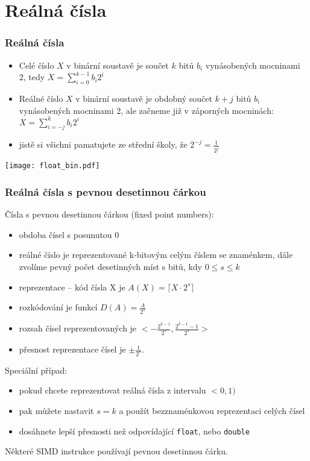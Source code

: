 \documentclass{beamer}
\begin{document}
\section{Reálná čísla}


\begin{frame}
\frametitle{Reálná čísla}

\begin{itemize}
\item Celé číslo $X$ v binární soustavě je součet $k$ bitů $b_i$ vynásobených mocninami 2, tedy $ X = \sum_{i=0}^{k-1} b_i 2^{i} $
\item Reálné číslo $X$ v binární soustavě je obdobný součet $k+j$ bitů $b_i$ vynásobených mocninami 2, ale začneme již v záporných mocninách: $X = \sum_{i=-j}^{k} b_i 2^{i}$
\item jistě si všichni pamatujete ze střední školy, že $2^{-j} = \frac{1}{2^j}$
\end{itemize}


\begin{center}
\texttt{[image: float\_bin.pdf]}
\end{center}

\end{frame}


\begin{frame}
\frametitle{Reálná čísla s pevnou desetinnou čárkou}

Čísla s pevnou desetinnou čárkou (fixed point numbers):

\begin{itemize}
\item obdoba čísel s posunutou 0
\item reálné číslo je reprezentované k-bitovým celým číslem se znaménkem, dále zvolíme pevný počet desetinných míst s bitů, kdy $0 \le s \le k$
\item reprezentace -- kód čísla X je $A(X) = \lceil X \cdot 2^s \rceil$
\item rozkódování je funkcí $D(A) = \frac{A}{2^s}$
\item rozsah čísel reprezentovaných je $<-\frac{2^{k-1}}{2^s}, \frac{2^{k-1}-1}{2^s}>$
\item přesnost reprezentace čísel je $\pm \frac{1}{2^s}$.
\end{itemize}

Speciální případ:
\begin{itemize}
\item pokud chcete reprezentovat reálná čísla z intervalu $<0,1)$
\item pak můžete nastavit $s=k$ a použít bezznaménkovou reprezentaci celých čísel
\item dosáhnete lepší přesnosti než odpovídající \texttt{float}, nebo \texttt{double}
\end{itemize}

Některé SIMD instrukce používají pevnou desetinnou čárku.

\end{frame}
\end{document}

